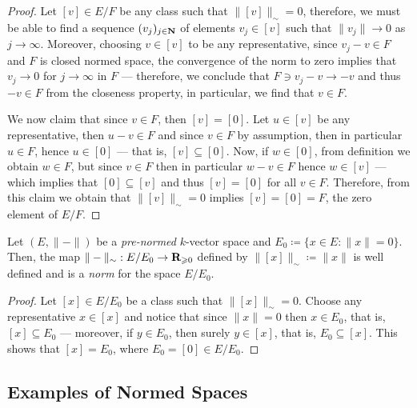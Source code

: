 \begin{proof}
Let \([v] \in E/F\) be any class such that \(\| [v] \|_{\sim} = 0\), therefore,
we must be able to find a sequence \((v_j)_{j \in \mathbf{N}}\) of elements \(v_j \in
[v]\) such that \(\| v_{j} \| \to 0\) as \(j \to \infty\). Moreover, choosing
\(v \in [v]\) to be any representative, since \(v_j - v \in F\) and \(F\) is
closed normed space, the convergence of the norm to zero implies that \(v_j \to
0\) for \(j \to \infty\) in \(F\) --- therefore, we conclude that \(F \ni v_j -
v \to -v\) and thus \(-v \in F\) from the closeness property, in particular, we
find that \(v \in F\).

We now claim that since \(v \in F\), then \([v] = [0]\). Let \(u \in [v]\) be
any representative, then \(u - v \in F\) and since \(v \in F\) by assumption,
then in particular \(u \in F\), hence \(u \in [0]\) --- that is, \([v] \subseteq
[0]\). Now, if \(w \in [0]\), from definition we obtain \(w \in F\), but since
\(v \in F\) then in particular \(w - v \in F\) hence \(w \in [v]\) --- which
implies that \([0] \subseteq [v]\) and thus \([v] = [0]\) for all \(v \in
F\). Therefore, from this claim we obtain that \(\| [v] \|_{\sim} = 0\) implies
\([v] = [0] = F\), the zero element of \(E/F\).
\end{proof}

\begin{proposition}
\label{prop:norm-out-of-prenorm}
Let \((E, \| - \|)\) be a \emph{pre-normed} \(k\)-vector space and \(E_0 \coloneq
\{x \in E \colon \| x \| = 0\}\). Then, the map \(\| - \|_{\sim}: E / E_0 \to
\mathbf{R}_{\geqslant 0}\) defined by \(\| [x] \|_{\sim} \coloneq \| x \|\) is well defined
and is a \emph{norm} for the space \(E / E_0\).
\end{proposition}

\begin{proof}
Let \([x] \in E / E_0\) be a class such that \(\| [x] \|_{\sim} = 0\). Choose
any representative \(x \in [x]\) and notice that since \(\| x \| = 0\) then \(x
\in E_0\), that is, \([x] \subseteq E_0\) --- moreover, if \(y \in E_0\), then
surely \(y \in [x]\), that is, \(E_0 \subseteq [x]\). This shows that \([x] =
E_0\), where \(E_0 = [0] \in E / E_0\).
\end{proof}

\subsection{Examples of Normed Spaces}

